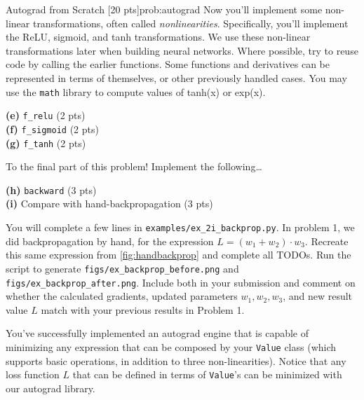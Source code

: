 \begin{problem}{Autograd from Scratch \hfill {[20 pts]}}{prob:autograd}
Now you'll implement some non-linear transformations, often called
\textit{nonlinearities}. Specifically, you'll implement the ReLU, sigmoid, and
tanh transformations. We use these non-linear transformations later when
building neural networks. Where possible, try to reuse code by calling the
earlier functions. Some functions and derivatives can be represented in terms of
themselves, or other previously handled cases. You may use the \verb|math|
library to compute values of tanh(x) or exp(x).

\vspace{10px}
\begin{adjustwidth}{2em}{2em}
    \textbf{(e)} \verb|f_relu| \hfill (2 pts)\\
    \textbf{(f)} \verb|f_sigmoid| \hfill (2 pts) \\
    \textbf{(g)} \verb|f_tanh| \hfill (2 pts)\\
\end{adjustwidth}
\vspace{10px}


To the final part of this problem! Implement the following\ldots

\vspace{10px}
\begin{adjustwidth}{2em}{2em}
\textbf{(h)} \verb|backward| \hfill (3 pts)\\
\textbf{(i)} {Compare with hand-backpropagation} \hfill (3 pts)\\

\begin{adjustwidth}{2em}{2em}
You will complete a few lines in \verb|examples/ex_2i_backprop.py|. In
problem 1, we did backpropagation by hand, for the expression $L = (w_1 +
w_2) \cdot w_3$. Recreate this same expression from \cref{fig:handbackprop}
and complete all TODOs. Run the script to generate
\verb|figs/ex_backprop_before.png| and \verb|figs/ex_backprop_after.png|.
Include both in your submission and comment on whether the calculated
gradients, updated parameters $w_1,w_2,w_3$, and new result value $L$ match
with your previous results in Problem 1.\\
\end{adjustwidth}

\vspace{10px}
You've successfully implemented an autograd engine that is capable of minimizing
any expression that can be composed by your \verb|Value| class (which supports
basic operations, in addition to three non-linearities). Notice that any loss
function $L$ that can be defined in terms of \verb|Value|'s  can be minimized
with our autograd library.\\
    
\end{adjustwidth}
\vspace{10px}
\end{problem}


